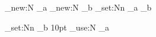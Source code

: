 \documentclass[a4paper, 11pt]{book}
\begin{document}
\ExplSyntaxOn
    \dim_new:N \dim_a
    \dim_new:N \dim_b
    \dim_set:Nn \dim_a {\dim_b}

    \dim_set:Nn \dim_b {10pt}
    \dim_use:N \dim_a
\ExplSyntaxOff
\end{document}
